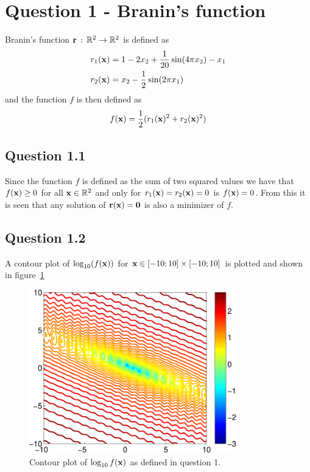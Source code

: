 \def\assignmenttitle{Assignment 1}
\def\assignmentdate{16-10-2011}
\def\assignmentnumber{1}





\maketitle

\section*{Question 1 - Branin's function}
Branin's function $\mathbf{r}\,:\,\mathbb{R}^2\to\mathbb{R}^2$ is defined as
\begin{align}
    r_1(\mathbf{x}) &= 1 - 2x_2 + \frac{1}{20}\sin(4\pi x_2) - x_1 \nonumber\\
    r_2(\mathbf{x}) &= x_2 - \frac{1}{2}\sin(2\pi x_1)\label{eq:branin}
\end{align}
and the function $f$ is then defined as
\begin{equation}\label{eq:braninsq}
    f(\mathbf{x}) = \frac{1}{2}(r_1(\mathbf{x})^2 + r_2(\mathbf{x})^2)
\end{equation}
\subsection*{Question 1.1}
Since the function $f$ is defined as the sum of two squared values we have that $f(\mathbf{x})\geq 0$ for all $\mathbf{x}\in\mathbb{R}^2$ and only for $r_1(\mathbf{x})=r_2(\mathbf{x})=0$ is $f(\mathbf{x})=0$. From this it is seen that any solution of $\mathbf{r}(\mathbf{x})=\mathbf{0}$ is also a minimizer of $f$.

\subsection*{Question 1.2}
A contour plot of $\log_{10}(f(\mathbf{x}))$ for $\mathbf{x}\in[-10;10]\times[-10;10]$ is plotted and shown in figure~\ref{fig:q12}
\begin{figure}
    \centering
    \includegraphics[width=90mm]{q12-crop.pdf}
    \caption{Contour plot of $\log_{10}f(\mathbf{x})$ as defined in question 1.}
    \label{fig:q12}
\end{figure}

